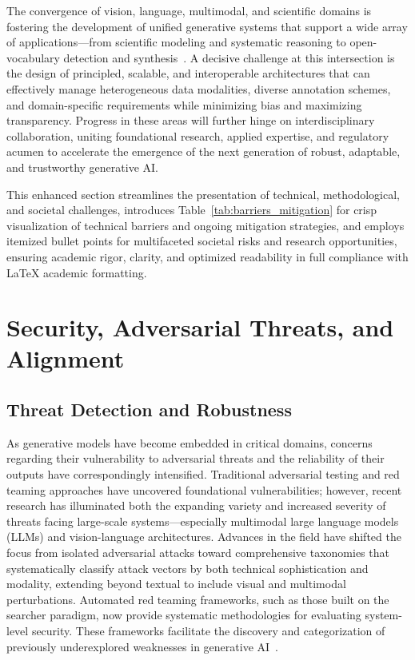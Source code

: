 \documentclass[sigconf]{acmart}
\begin{document}
The convergence of vision, language, multimodal, and scientific domains is fostering the development of unified generative systems that support a wide array of applications—from scientific modeling and systematic reasoning to open-vocabulary detection and synthesis~\cite{ref1,ref2,ref3,ref5,ref6,ref7,ref8,ref9,ref10,ref12,ref13,ref14,ref15,ref16,ref18,ref21,ref22,ref24,ref25,ref26,ref27,ref28,ref29,ref30,ref31,ref32,ref33,ref34,ref35,ref39,ref40,ref42,ref43,ref44,ref45,ref51,ref52,ref53,ref54,ref55,ref56,ref57,ref58,ref59,ref60,ref63,ref67,ref69,ref70,ref76,ref77,ref78,ref79,ref80,ref81,ref82}. A decisive challenge at this intersection is the design of principled, scalable, and interoperable architectures that can effectively manage heterogeneous data modalities, diverse annotation schemes, and domain-specific requirements while minimizing bias and maximizing transparency. Progress in these areas will further hinge on interdisciplinary collaboration, uniting foundational research, applied expertise, and regulatory acumen to accelerate the emergence of the next generation of robust, adaptable, and trustworthy generative AI.

This enhanced section streamlines the presentation of technical, methodological, and societal challenges, introduces Table~\ref{tab:barriers_mitigation} for crisp visualization of technical barriers and ongoing mitigation strategies, and employs itemized bullet points for multifaceted societal risks and research opportunities, ensuring academic rigor, clarity, and optimized readability in full compliance with LaTeX academic formatting.

\section{Security, Adversarial Threats, and Alignment}

\subsection{Threat Detection and Robustness}

As generative models have become embedded in critical domains, concerns regarding their vulnerability to adversarial threats and the reliability of their outputs have correspondingly intensified. Traditional adversarial testing and red teaming approaches have uncovered foundational vulnerabilities; however, recent research has illuminated both the expanding variety and increased severity of threats facing large-scale systems—especially multimodal large language models (LLMs) and vision-language architectures. Advances in the field have shifted the focus from isolated adversarial attacks toward comprehensive taxonomies that systematically classify attack vectors by both technical sophistication and modality, extending beyond textual to include visual and multimodal perturbations. Automated red teaming frameworks, such as those built on the searcher paradigm, now provide systematic methodologies for evaluating system-level security. These frameworks facilitate the discovery and categorization of previously underexplored weaknesses in generative AI~\cite{ref67,ref85}.
\end{document}
